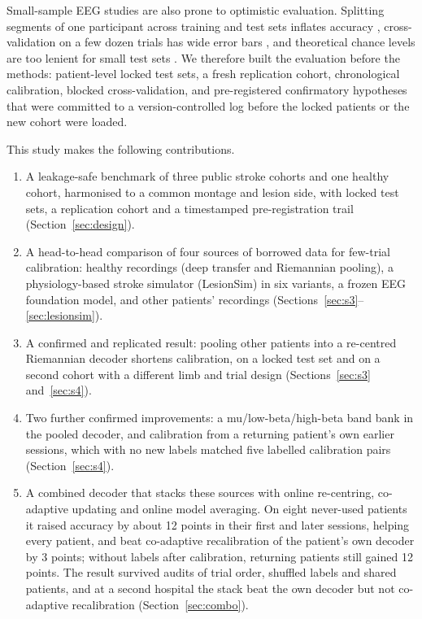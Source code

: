 \documentclass[11pt]{article}
\begin{document}
Small-sample EEG studies are also prone to optimistic evaluation. Splitting segments of one participant across training and test sets inflates accuracy \citep{brookshire2024}, cross-validation on a few dozen trials has wide error bars \citep{varoquaux2018}, and theoretical chance levels are too lenient for small test sets \citep{combrisson2015}. We therefore built the evaluation before the methods: patient-level locked test sets, a fresh replication cohort, chronological calibration, blocked cross-validation, and pre-registered confirmatory hypotheses that were committed to a version-controlled log before the locked patients or the new cohort were loaded.

This study makes the following contributions.
\begin{enumerate}
  \item A leakage-safe benchmark of three public stroke cohorts and one healthy cohort, harmonised to a common montage and lesion side, with locked test sets, a replication cohort and a timestamped pre-registration trail (Section~\ref{sec:design}).
  \item A head-to-head comparison of four sources of borrowed data for few-trial calibration: healthy recordings (deep transfer and Riemannian pooling), a physiology-based stroke simulator (LesionSim) in six variants, a frozen EEG foundation model, and other patients' recordings (Sections~\ref{sec:s3}--\ref{sec:lesionsim}).
  \item A confirmed and replicated result: pooling other patients into a re-centred Riemannian decoder shortens calibration, on a locked test set and on a second cohort with a different limb and trial design (Sections~\ref{sec:s3} and~\ref{sec:s4}).
  \item Two further confirmed improvements: a mu/low-beta/high-beta band bank in the pooled decoder, and calibration from a returning patient's own earlier sessions, which with no new labels matched five labelled calibration pairs (Section~\ref{sec:s4}).
  \item A combined decoder that stacks these sources with online re-centring, co-adaptive updating and online model averaging. On eight never-used patients it raised accuracy by about 12 points in their first and later sessions, helping every patient, and beat co-adaptive recalibration of the patient's own decoder by 3 points; without labels after calibration, returning patients still gained 12 points. The result survived audits of trial order, shuffled labels and shared patients, and at a second hospital the stack beat the own decoder but not co-adaptive recalibration (Section~\ref{sec:combo}).

\end{enumerate}
\end{document}
